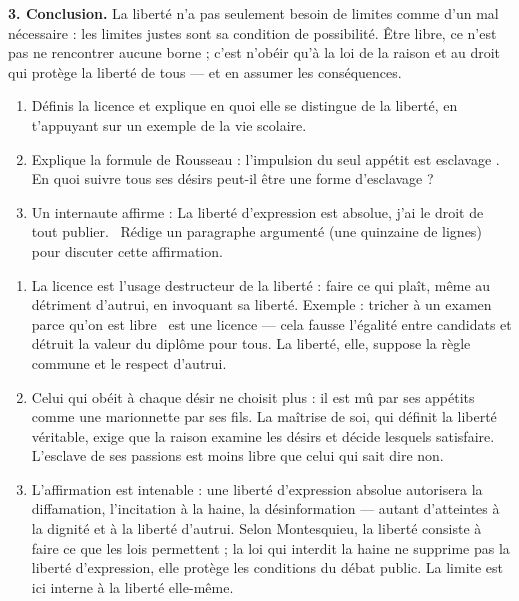 \documentclass[11pt]{article}
\newcommand{\cle}[1]{{\popxbold\color{popdark}#1}}
\begin{document}
\begin{exoresolu}
\textbf{3. Conclusion.} La liberté n'a pas seulement besoin de limites comme d'un mal nécessaire : les limites justes sont sa condition de possibilité. Être libre, ce n'est pas ne rencontrer aucune borne ; c'est n'obéir qu'à la loi de la raison et au droit qui protège la liberté de tous — et en assumer les conséquences.
\end{exoresolu}

\begin{exercice}
\begin{enumerate}
\item Définis la \cle{licence} et explique en quoi elle se distingue de la liberté, en t'appuyant sur un exemple de la vie scolaire.
\item Explique la formule de Rousseau : \guillemotleft l'impulsion du seul appétit est esclavage \guillemotright. En quoi suivre tous ses désirs peut-il être une forme d'esclavage ?
\item Un internaute affirme : \guillemotleft La liberté d'expression est absolue, j'ai le droit de tout publier. \guillemotright\ Rédige un paragraphe argumenté (une quinzaine de lignes) pour discuter cette affirmation.
\end{enumerate}
\end{exercice}

\begin{corrige}
\begin{enumerate}
\item La licence est l'usage destructeur de la liberté : faire ce qui plaît, même au détriment d'autrui, en invoquant sa liberté. Exemple : tricher à un examen \guillemotleft parce qu'on est libre \guillemotright\ est une licence — cela fausse l'égalité entre candidats et détruit la valeur du diplôme pour tous. La liberté, elle, suppose la règle commune et le respect d'autrui.
\item Celui qui obéit à chaque désir ne choisit plus : il est mû par ses appétits comme une marionnette par ses fils. La maîtrise de soi, qui définit la liberté véritable, exige que la raison examine les désirs et décide lesquels satisfaire. L'esclave de ses passions est moins libre que celui qui sait dire non.
\item L'affirmation est intenable : une liberté d'expression absolue autorisera la diffamation, l'incitation à la haine, la désinformation — autant d'atteintes à la dignité et à la liberté d'autrui. Selon Montesquieu, la liberté consiste à faire ce que les lois permettent ; la loi qui interdit la haine ne supprime pas la liberté d'expression, elle protège les conditions du débat public. La limite est ici interne à la liberté elle-même.
\end{enumerate}
\end{corrige}
\end{document}
